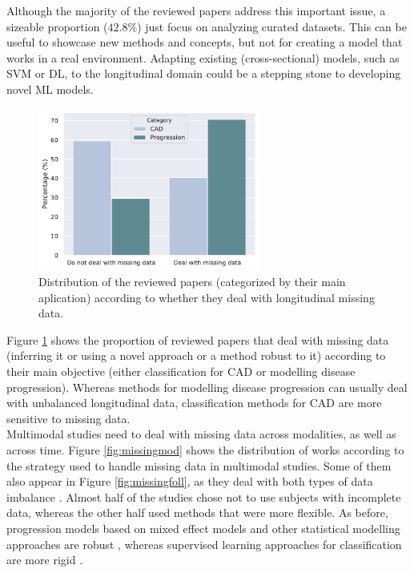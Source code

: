 Although the majority of the reviewed papers address this important issue, a sizeable proportion ($42.8 \%$) just focus on analyzing curated datasets. This can be useful to showcase new methods and concepts, but not for creating a model that works in a real environment. Adapting existing (cross-sectional) models, such as SVM or DL, to the longitudinal domain \cite{Adhikari2019,Ghazi2019,Jie2017,Zhu2016a} could be a stepping stone to developing novel ML models. \\

\begin{figure}[!htbp]
\centering
\includegraphics[width=0.65\textwidth]{figures/review/Fig8.pdf}
    \caption[Distribution of the reviewed papers according to whether they deal with longitudinal missing data.]{Distribution of the reviewed papers (categorized by their main aplication) according to whether they deal with longitudinal missing data.}
    \label{fig:missingcat}
\end{figure}

Figure \ref{fig:missingcat} shows the proportion of reviewed papers that deal with missing data (inferring it or using a novel approach or a method robust to it) according to their main objective (either classification for CAD or modelling disease progression). Whereas methods for modelling disease progression can usually deal with unbalanced longitudinal data, classification methods for CAD are more sensitive to missing data.  \\

Multimodal studies need to deal with missing data across modalities, as well as across time. Figure \ref{fig:missingmod} shows the distribution of works according to the strategy used to handle missing data in multimodal studies. Some of them also appear in Figure \ref{fig:missingfoll}, as they deal with both types of data imbalance \cite{Adhikari2019,Goyal2018,Iturria-Medina2016,Jedynak2012}. Almost half of the studies chose not to use subjects with incomplete data, whereas the other half used methods that were more flexible. As before, progression models based on mixed effect models and other statistical modelling approaches are robust \cite{Iturria-Medina2016,Jedynak2012,Schmidt-Richberg2015,Villemagne2013}, whereas supervised learning approaches for classification are more rigid \cite{Vounou2012,Young2014,Zhang2012a}. \\

